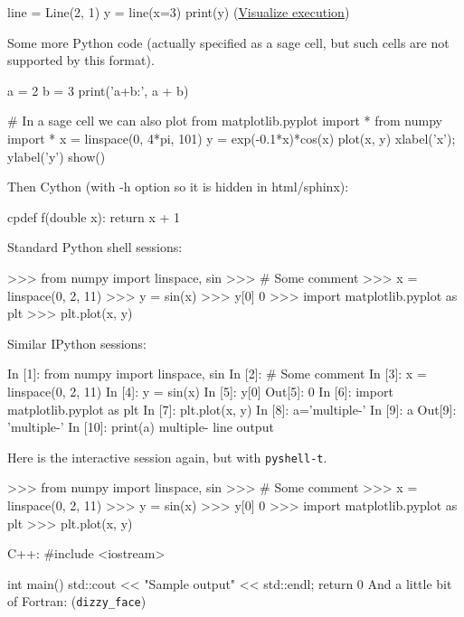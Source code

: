 \documentclass[%
oneside,                 %
final,                   %
10pt]{article}
\theoremstyle{definition}
\begin{document}
line = Line(2, 1)
y = line(x=3)
print(y)
\epypro
\noindent
(\href{{https://pythontutor.com/visualize.html\#code=class+Line\%3A\%0A++++def+__init__\%28self\%2C+a\%2C+b\%29\%3A\%0A++++++++self.a\%2C+self.b+\%3D+a\%2C+b\%0A\%0A++++def+__call__\%28self\%2C+x\%29\%3A\%0A++++++++a\%2C+b+\%3D+self.a\%2C+self.b\%0A++++++++return+a\%2Ax+\%2B+b\%0A\%0Aline+\%3D+Line\%282\%2C+1\%29\%0Ay+\%3D+line\%28x\%3D3\%29\%0Aprint\%28y\%29&mode=display&cumulative=false&heapPrimitives=false&drawParentPointers=false&textReferences=false&py=2&curInstr=0}}{Visualize execution}) 


Some more Python code (actually specified as a sage cell, but
such cells are not supported by this format).

\bpypro
a = 2
b = 3
print('a+b:', a + b)

# In a sage cell we can also plot
from matplotlib.pyplot import *
from numpy import *
x = linspace(0, 4*pi, 101)
y = exp(-0.1*x)*cos(x)
plot(x, y)
xlabel('x'); ylabel('y')
show()
\epypro

Then Cython (with -h option so it is hidden in html/sphinx):

\bcycod
cpdef f(double x):
    return x + 1
\ecycod

Standard Python shell sessions:

\bpyshell
>>> from numpy import linspace, sin
>>> # Some comment
>>> x = linspace(0, 2, 11)
>>> y = sin(x)
>>> y[0]
0
>>> import matplotlib.pyplot as plt
>>> plt.plot(x, y)
\epyshell

Similar IPython sessions:

\bipy
In [1]: from numpy import linspace, sin
In [2]: # Some comment
In [3]: x = linspace(0, 2, 11)
In [4]: y = sin(x)
In [5]: y[0]
Out[5]: 0
In [6]: import matplotlib.pyplot as plt
In [7]: plt.plot(x, y)
In [8]: a='multiple-\nline\noutput'
In [9]: a
Out[9]: 'multiple-\nline\noutput'
In [10]: print(a)
multiple-
line
output
\eipy

Here is the interactive session again, but with \texttt{pyshell-t}.

\bpyshell
>>> from numpy import linspace, sin
>>> # Some comment
>>> x = linspace(0, 2, 11)
>>> y = sin(x)
>>> y[0]
0
>>> import matplotlib.pyplot as plt
>>> plt.plot(x, y)
\epyshell

C++:
\bcpppro
#include <iostream>

int main()
{
   std::cout << "Sample output" << std::endl;
   return 0
}
\ecpppro
And a little bit of Fortran: (\Verb!dizzy_face!)
\end{document}
